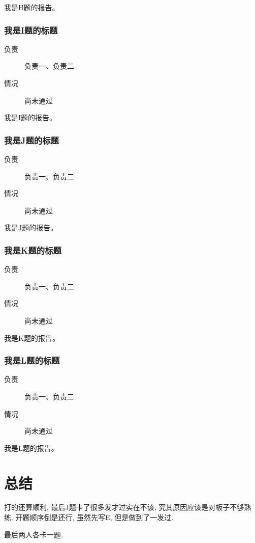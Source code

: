 \documentclass[a4paper, 11pt, nofonts, nocap, fancyhdr]{ctexart}
\newcommand{\problem}[1]{\subsubsection{#1}}
\begin{document}
我是H题的报告。

\problem{我是I题的标题}

\begin{description}
\item[负责] 负责一、负责二
\item[情况] 尚未通过
\end{description}

我是I题的报告。


\problem{我是J题的标题}

\begin{description}
\item[负责] 负责一、负责二
\item[情况] 尚未通过
\end{description}

我是J题的报告。



\problem{我是K题的标题}

\begin{description}
\item[负责] 负责一、负责二
\item[情况] 尚未通过
\end{description}

我是K题的报告。


\problem{我是L题的标题}

\begin{description}
\item[负责] 负责一、负责二
\item[情况] 尚未通过
\end{description}

我是L题的报告。

\section{总结}

打的还算顺利, 最后J题卡了很多发才过实在不该, 究其原因应该是对板子不够熟练. 开题顺序倒是还行, 虽然先写E, 但是做到了一发过. 

最后两人各卡一题.
\end{document}
